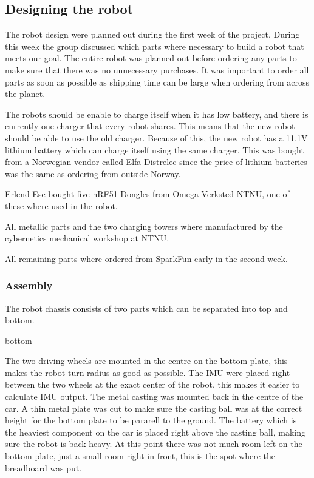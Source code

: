\subsection{Designing the robot}
The robot design were planned out during the first week of the project. During this week the group discussed which parts where necessary to build a robot that meets our goal. The entire robot was planned out before ordering any parts to make sure that there was no unnecessary purchases. It was important to order all parts as soon as possible as shipping time can be large when ordering from across the planet.

The robots should be enable to charge itself when it has low battery, and there is currently one charger that every robot shares. This means that the new robot should be able to use the old charger. Because of this, the new robot has a 11.1V lithium battery which can charge itself using the same charger. This was bought from a Norwegian vendor called Elfa Distrelec\cite{elfa} since the price of lithium batteries was the same as ordering from outside Norway.

Erlend Ese bought five nRF51 Dongles from Omega Verksted NTNU, one of these where used in the robot.

All metallic parts and the two charging towers where manufactured by the cybernetics mechanical workshop at NTNU.


All remaining parts where ordered from SparkFun early in the second week.


\subsubsection{Assembly}
The robot chassis consists of two parts which can be separated into top and bottom.

bottom

The two driving wheels are mounted in the centre on the bottom plate, this makes the robot turn radius as good as possible. The IMU were placed right between the two wheels at the exact center of the robot, this makes it easier to calculate IMU output. The metal casting was mounted back in the centre of the car. A thin metal plate was cut to make sure the casting ball was at the correct height for the bottom plate to be pararell to the ground. The battery which is the heaviest component on the car is placed right above the casting ball, making sure the robot is back heavy. At this point there was not much room left on the bottom plate, just a small room right in front, this is the spot where the breadboard was put.

